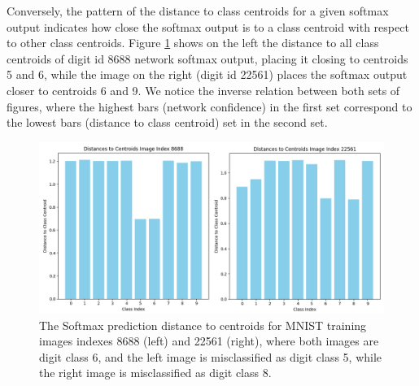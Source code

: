 Conversely, the pattern of the distance to class centroids for a given softmax output %
indicates how close the softmax output is to a class centroid with respect to other class centroids. Figure \ref{fig:distances_to_centroids_8688_22561} shows on the left the distance to all class centroids of digit id 8688 network softmax output, placing it closing to centroids 5 and 6, while the image on the right (digit id 22561) places the softmax output closer to centroids 6 and 9. We notice the inverse relation between both sets of figures, where the highest bars (network confidence) in the first set correspond to the lowest bars (distance to class centroid) set in the second set.






\begin{figure}[H]
    \centering
    \includegraphics[width=0.99\columnwidth]{Figures/distances_to_centroids_8688_22561.png}
    \caption{The Softmax prediction distance to centroids for MNIST training images indexes 8688 (left) and 22561 (right), where both images are digit class 6, and the left image is misclassified as digit class 5, while the right image is misclassified as digit class 8.}
    \label{fig:distances_to_centroids_8688_22561} 
\end{figure}


